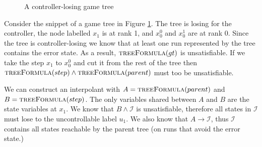 \documentclass{llncs}
\begin{document}
\begin{figure}
    \centering
    \caption{A controller-losing game tree}
    \label{fig:interpolatetree}
\end{figure}

Consider the snippet of a game tree in Figure \ref{fig:interpolatetree}. The
tree is losing for the controller, the node labelled $x_1$ is at rank 1, and
$x_0^0$ and $x_0^1$ are at rank 0. Since the tree is controller-losing we know
that at least one run represented by the tree contains the error state.  As
a result, $\textsc{treeFormula}(gt)$ is unsatisfiable. If we take the step
$x_1$ to $x_0^0$ and cut it from the rest of the tree then
$\textsc{treeFormula}(step) \land \textsc{treeFormula}(parent)$ must too be
unsatisfiable.

We can construct an interpolant with $A = \textsc{treeFormula}(parent)$ and $B
= \textsc{treeFormula}(step)$. The only variables shared between $A$ and $B$
are the state variables at $x_1$. We know that $B \land \mathcal{I}$ is
unsatisfiable, therefore all states in $\mathcal{I}$ must lose to the
uncontrollable label $u_1$. We also know that $A \to \mathcal{I}$, thus
$\mathcal{I}$ contains all states reachable by the parent tree (on runs that
avoid the error state.)
\end{document}
